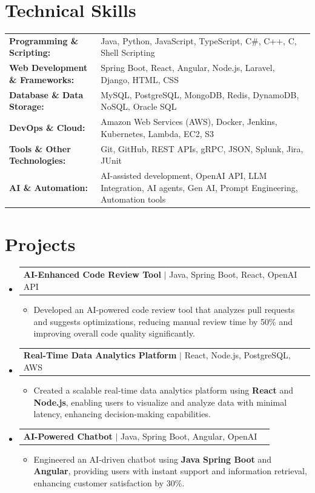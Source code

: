 \documentclass[letterpaper,10pt]{article}
\makeatletter
\newcommand{\resumeItem}[1]{
  \item{\fontsize{8pt}{9pt}\selectfont
    #1 \vspace{-3pt}
  }
}
\newcommand{\resumeProjectHeading}[2]{
    \item
    \begin{tabular*}{1.001\textwidth}{l@{\extracolsep{\fill}}r}
      \fontsize{8.5pt}{10pt}#1 & \textbf{\fontsize{8.5pt}{10pt} #2}\\
    \end{tabular*}\vspace{-7pt}
}
\newcommand{\resumeSubHeadingListStart}{\begin{itemize}[leftmargin=0pt, label={}]}
\newcommand{\resumeSubHeadingListEnd}{\end{itemize}}
\newcommand{\resumeItemListStart}{\begin{itemize}[leftmargin=*]}
\newcommand{\resumeItemListEnd}{\end{itemize}\vspace{-5pt}}
\makeatother
\begin{document}
\section{Technical Skills}
        \vspace{-14pt}
        \begin{table}[h]
            \fontsize{8pt}{9pt}\selectfont
            \begin{tabular}{p{0.3\linewidth} p{0.7\linewidth}}
                \textbf{Programming \& Scripting:} & Java, Python, JavaScript, TypeScript, C\#, C++, C, Shell Scripting \\
                \textbf{Web Development \& Frameworks:} & Spring Boot, React, Angular, Node.js, Laravel, Django, HTML, CSS \\
                \textbf{Database \& Data Storage:} & MySQL, PostgreSQL, MongoDB, Redis, DynamoDB, NoSQL, Oracle SQL \\
                \textbf{DevOps \& Cloud:} & Amazon Web Services (AWS), Docker, Jenkins, Kubernetes, Lambda, EC2, S3 \\
                \textbf{Tools \& Other Technologies:} & Git, GitHub, REST APIs, gRPC, JSON, Splunk, Jira, JUnit \\
                \textbf{AI \& Automation:} & AI-assisted development, OpenAI API, LLM Integration, AI agents, Gen AI, Prompt Engineering, Automation tools \\
            \end{tabular}
        \end{table}
 \vspace{-18pt}

\section{Projects}
    \vspace{-5pt}
    \resumeSubHeadingListStart
          \resumeProjectHeading
            {\textbf{AI-Enhanced Code Review Tool} $|$ Java, Spring Boot, React, OpenAI API}{}
            \resumeItemListStart
                \resumeItem{Developed an AI-powered code review tool that analyzes pull requests and suggests optimizations, reducing manual review time by 50\% and improving overall code quality significantly.}
            \resumeItemListEnd
        \vspace{-12pt}
    
        \resumeProjectHeading
            {\textbf{Real-Time Data Analytics Platform} $|$ React, Node.js, PostgreSQL, AWS}{}
        \resumeItemListStart
                \resumeItem{Created a scalable real-time data analytics platform using \textbf{React} and \textbf{Node.js}, enabling users to visualize and analyze data with minimal latency, enhancing decision-making capabilities.}
        \resumeItemListEnd
      \vspace{-12pt}
      \resumeProjectHeading
        {\textbf{AI-Powered Chatbot} $|$ Java, Spring Boot, Angular, OpenAI}{}
    \resumeItemListStart
            \resumeItem{Engineered an AI-driven chatbot using \textbf{Java Spring Boot} and \textbf{Angular}, providing users with instant support and information retrieval, enhancing customer satisfaction by 30\%.}
    \resumeItemListEnd
    \resumeSubHeadingListEnd
\end{document}
